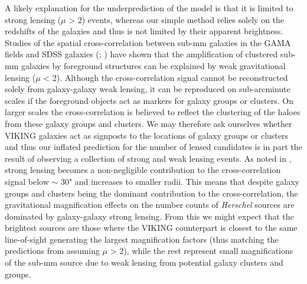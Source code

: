 A likely explanation for the underprediction of the \citealt{Cai_2013} model is that it is limited to strong lensing ($\mu$ > 2) events, whereas our simple method relies solely on the redshifts of the galaxies and thus is not limited by their apparent brightness. Studies of the spatial cross-correlation between sub-mm galaxies in the GAMA fields and SDSS galaxies (\citealt{Gonzalez-Nuevo_2014}; \citealt{Gonzalez-Nuevo_2017}) have shown that the amplification of clustered sub-mm galaxies by foreground structures can be explained by weak gravitational lensing ($\mu$ < 2). Although the cross-correlation signal cannot be reconstructed solely from galaxy-galaxy weak lensing, it can be reproduced on sub-arcminute scales if the foreground objects act as markers for galaxy groups or clusters. On larger scales the cross-correlation is believed to reflect the clustering of the haloes from these galaxy groups and clusters. We may therefore ask ourselves whether VIKING galaxies act as signposts to the locations of galaxy groups or clusters and thus our inflated prediction for the number of lensed candidates is in part the result of observing a collection of strong and weak lensing events. As noted in \citealt{Gonzalez-Nuevo_2017}, strong lensing becomes a non-negligible contribution to the cross-correlation signal below $\sim$ 30" and increases to smaller radii. This means that despite galaxy groups and clusters being the dominant contribution to the cross-correlation, the gravitational magnification effects on the number counts of \textit{Herschel} sources are dominated by galaxy-galaxy strong lensing. From this we might expect that the brightest sources are those where the VIKING counterpart is closest to the same line-of-sight generating the largest magnification factors (thus matching the predictions from \citealt{Cai_2013} assuming $\mu$ > 2), while the rest represent small magnifications of the sub-mm source due to weak lensing from potential galaxy clusters and groups.

